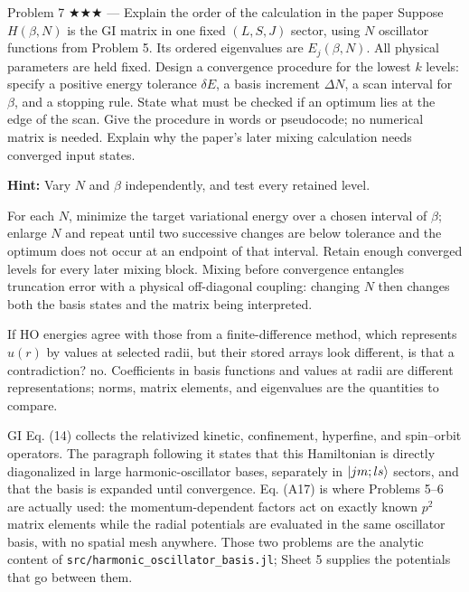 \documentclass[11pt]{article}
\begin{document}
\begin{problem}{Problem 7 ★★★ — Explain the order of the calculation in the paper}
Suppose $H(\beta,N)$ is the GI matrix in one fixed $(L,S,J)$ sector,
using $N$ oscillator functions from Problem 5. Its ordered eigenvalues
are $E_j(\beta,N)$. All physical parameters are held fixed.
Design a convergence procedure for the lowest $k$ levels: specify a positive
energy tolerance $\delta E$, a basis increment $\Delta N$, a scan interval
for $\beta$, and a stopping rule. State what must be checked if an optimum
lies at the edge of the scan. Give the procedure in words or pseudocode;
no numerical matrix is needed.
Explain why the paper's later mixing calculation needs converged input states.

\textbf{Hint:} Vary $N$ and $\beta$ independently, and test every retained level.
\end{problem}
\begin{solution}
For each $N$, minimize the target variational energy over a chosen interval of
$\beta$; enlarge
$N$ and repeat until two successive changes are below tolerance and the optimum
does not occur at an endpoint of that interval. Retain enough converged levels for every
later mixing block. Mixing before convergence entangles truncation error with a
physical off-diagonal coupling: changing $N$ then changes both the basis states
and the matrix being interpreted.
\end{solution}
\begin{quiz}
If HO energies agree with those from a finite-difference method, which represents
$u(r)$ by values at selected radii, but their stored arrays look different, is
that a contradiction? \answer no. Coefficients in basis functions and values at
radii are different representations; norms, matrix elements, and eigenvalues
are the quantities to compare.
\end{quiz}

\begin{paperbridge}
GI Eq. (14) collects the relativized kinetic, confinement, hyperfine, and
spin--orbit operators. The paragraph following it states that this Hamiltonian
is directly diagonalized in large harmonic-oscillator bases, separately in
$\lvert jm;ls\rangle$ sectors, and that the basis is expanded until convergence.
Eq. (A17) is where Problems 5--6 are actually used: the momentum-dependent
factors act on exactly known $p^2$ matrix elements while the radial potentials
are evaluated in the same oscillator basis, with no spatial mesh anywhere. Those
two problems are the analytic content of
\texttt{src/harmonic\_oscillator\_basis.jl}; Sheet 5 supplies the potentials
that go between them.
\end{paperbridge}
\end{document}
